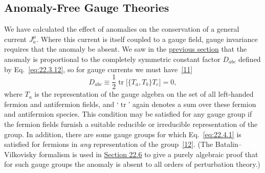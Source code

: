 \subsection{Anomaly-Free Gauge Theories}
\label{sec:22.4}

We have calculated the effect of anomalies on the conservation of a general
current $J_a^\mu$. Where this current is itself coupled to a gauge
field, gauge invariance requires that the anomaly be absent. We saw in the
\hyperref[sec:22.3]{previous section} that the anomaly is proportional to
the completely symmetric constant factor $D_{abc}$ defined
by Eq.~\eqref{eq:22.3.12}, so for gauge currents we must
have~\hyperref[ch22-ref-11]{[11]}
\begin{equation}
 D_{abc}\equiv
 \frac{1}{2}\operatorname{tr}
 \bigl[\{T_a,T_b\}T_c\bigr]=0,
 \tag{22.4.1}\label{eq:22.4.1}
\end{equation}
where $T_a$ is the representation of the gauge algebra on the set of
all left-handed fermion and antifermion fields, and `$\operatorname{tr}$'
again denotes a sum over these fermion and antifermion species. This
condition may be satisfied for any gauge group if the fermion fields
furnish a suitable reducible or irreducible representation of the group.
In addition, there are some gauge groups for which Eq.~\eqref{eq:22.4.1}
is satisfied for fermions in \emph{any} representation of the
group~\hyperref[ch22-ref-12]{[12]}. (The Batalin--Vilkovisky formalism is
used in \hyperref[sec:22.6]{Section 22.6} to give a purely algebraic proof
that for such gauge groups the anomaly is absent to all orders of
perturbation theory.)


